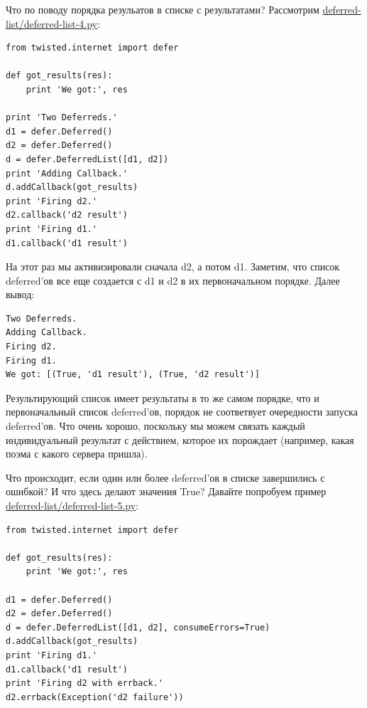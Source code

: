 Что по поводу порядка резульатов в списке с результатами? 
Рассмотрим \href{http://github.com/jdavisp3/twisted-intro/blob/master/deferred-list/deferred-list-4.py#L1}{deferred-list/deferred-list-4.py}:

\begin{scriptsize}\begin{verbatim}
from twisted.internet import defer

def got_results(res):
    print 'We got:', res

print 'Two Deferreds.'
d1 = defer.Deferred()
d2 = defer.Deferred()
d = defer.DeferredList([d1, d2])
print 'Adding Callback.'
d.addCallback(got_results)
print 'Firing d2.'
d2.callback('d2 result')
print 'Firing d1.'
d1.callback('d1 result')
\end{verbatim}\end{scriptsize}

На этот раз мы активизировали сначала d2, а потом d1. Заметим, что 
список deferred'ов все еще создается с d1 и d2 в их 
первоначальном порядке. Далее вывод:

\begin{scriptsize}\begin{verbatim}
Two Deferreds.
Adding Callback.
Firing d2.
Firing d1.
We got: [(True, 'd1 result'), (True, 'd2 result')]
\end{verbatim}\end{scriptsize}


Результирующий список имеет результаты в то же самом порядке, что и 
первоначальный список deferred'ов, порядок не соответвует 
очередности запуска deferred'ов. Что очень хорошо, поскольку 
мы можем связать каждый индивидуальный результат с 
действием, которое их порождает (например, какая поэма с какого сервера пришла).


Что происходит, если один или более deferred'ов в списке 
завершились с ошибкой? И что здесь делают значения True? 
Давайте попробуем пример \href{http://github.com/jdavisp3/twisted-intro/blob/master/deferred-list/deferred-list-5.py#L1}{deferred-list/deferred-list-5.py}:

\begin{scriptsize}\begin{verbatim}
from twisted.internet import defer

def got_results(res):
    print 'We got:', res

d1 = defer.Deferred()
d2 = defer.Deferred()
d = defer.DeferredList([d1, d2], consumeErrors=True)
d.addCallback(got_results)
print 'Firing d1.'
d1.callback('d1 result')
print 'Firing d2 with errback.'
d2.errback(Exception('d2 failure'))
\end{verbatim}\end{scriptsize}


